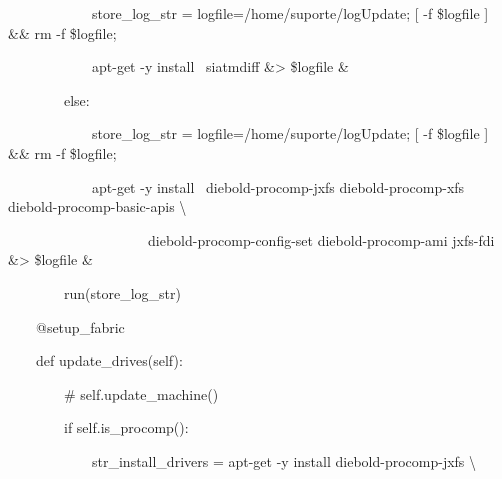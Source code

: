 {\ttfamily\color[rgb]{0.10980392,0.10980392,0.10980392}
    \ \ \ \ \ \ \ \ \ \ \ \ store\_log\_str = {\textquotedbl}{\textquotedbl}{\textquotedbl}logfile=/home/suporte/logUpdate;
    [ -f {\textquotedbl}\$logfile{\textquotedbl} ] \&\& rm -f {\textquotedbl}\$logfile{\textquotedbl};}

{\ttfamily\color[rgb]{0.10980392,0.10980392,0.10980392}
    \ \ \ \ \ \ \ \ \ \ \ \ apt-get -y install \ siatmdiff \&{\textgreater} {\textquotedbl}\$logfile{\textquotedbl}
    \&{\textquotedbl}{\textquotedbl}{\textquotedbl}}

{\ttfamily\color[rgb]{0.10980392,0.10980392,0.10980392}
    \ \ \ \ \ \ \ \ else:}

{\ttfamily\color[rgb]{0.10980392,0.10980392,0.10980392}
    \ \ \ \ \ \ \ \ \ \ \ \ store\_log\_str = {\textquotedbl}{\textquotedbl}{\textquotedbl}logfile=/home/suporte/logUpdate;
    [ -f {\textquotedbl}\$logfile{\textquotedbl} ] \&\& rm -f {\textquotedbl}\$logfile{\textquotedbl};}

{\ttfamily\color[rgb]{0.10980392,0.10980392,0.10980392}
    \ \ \ \ \ \ \ \ \ \ \ \ apt-get -y install \ diebold-procomp-jxfs diebold-procomp-xfs diebold-procomp-basic-apis
    {\textbackslash}}

{\ttfamily\color[rgb]{0.10980392,0.10980392,0.10980392}
    \ \ \ \ \ \ \ \ \ \ \ \ \ \ \ \ \ \ \ \ diebold-procomp-config-set diebold-procomp-ami jxfs-fdi \&{\textgreater}
    {\textquotedbl}\$logfile{\textquotedbl} \&{\textquotedbl}{\textquotedbl}{\textquotedbl}}


    \bigskip

{\ttfamily\color[rgb]{0.10980392,0.10980392,0.10980392}
    \ \ \ \ \ \ \ \ run(store\_log\_str)}


    \bigskip

{\ttfamily\color[rgb]{0.10980392,0.10980392,0.10980392}
    \ \ \ \ @setup\_fabric}

{\ttfamily\color[rgb]{0.10980392,0.10980392,0.10980392}
    \ \ \ \ def update\_drives(self):}

{\ttfamily\color[rgb]{0.10980392,0.10980392,0.10980392}
    \ \ \ \ \ \ \ \ \# self.update\_machine()}

{\ttfamily\color[rgb]{0.10980392,0.10980392,0.10980392}
    \ \ \ \ \ \ \ \ if self.is\_procomp():}

{\ttfamily\color[rgb]{0.10980392,0.10980392,0.10980392}
    \ \ \ \ \ \ \ \ \ \ \ \ str\_install\_drivers = {\textquotedbl}{\textquotedbl}{\textquotedbl}apt-get -y install
        diebold-procomp-jxfs {\textbackslash}}

